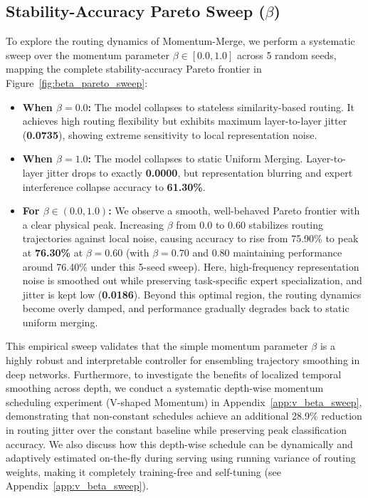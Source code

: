 \subsection{Stability-Accuracy Pareto Sweep ($\beta$)}
To explore the routing dynamics of Momentum-Merge, we perform a systematic sweep over the momentum parameter $\beta \in [0.0, 1.0]$ across 5 random seeds, mapping the complete stability-accuracy Pareto frontier in Figure~\ref{fig:beta_pareto_sweep}:
\begin{itemize}
    \item \textbf{When $\beta = 0.0$:} The model collapses to stateless similarity-based routing. It achieves high routing flexibility but exhibits maximum layer-to-layer jitter (\textbf{0.0735}), showing extreme sensitivity to local representation noise.
    \item \textbf{When $\beta = 1.0$:} The model collapses to static Uniform Merging. Layer-to-layer jitter drops to exactly \textbf{0.0000}, but representation blurring and expert interference collapse accuracy to \textbf{61.30\%}.
    \item \textbf{For $\beta \in (0.0, 1.0)$:} We observe a smooth, well-behaved Pareto frontier with a clear physical peak. Increasing $\beta$ from $0.0$ to $0.60$ stabilizes routing trajectories against local noise, causing accuracy to rise from 75.90\% to peak at \textbf{76.30\%} at $\beta = 0.60$ (with $\beta = 0.70$ and $0.80$ maintaining performance around 76.40\% under this 5-seed sweep). Here, high-frequency representation noise is smoothed out while preserving task-specific expert specialization, and jitter is kept low (\textbf{0.0186}). Beyond this optimal region, the routing dynamics become overly damped, and performance gradually degrades back to static uniform merging.
\end{itemize}
This empirical sweep validates that the simple momentum parameter $\beta$ is a highly robust and interpretable controller for ensembling trajectory smoothing in deep networks. Furthermore, to investigate the benefits of localized temporal smoothing across depth, we conduct a systematic depth-wise momentum scheduling experiment (V-shaped Momentum) in Appendix~\ref{app:v_beta_sweep}, demonstrating that non-constant schedules achieve an additional 28.9\% reduction in routing jitter over the constant baseline while preserving peak classification accuracy. We also discuss how this depth-wise schedule can be dynamically and adaptively estimated on-the-fly during serving using running variance of routing weights, making it completely training-free and self-tuning (see Appendix~\ref{app:v_beta_sweep}).

